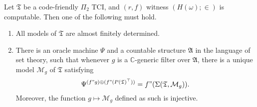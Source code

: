 \documentclass[12pt]{article}
\numberwithin{equation}{section}
\begin{document}
\begin{lem}\label{ctblegeneric}
Let $\mathfrak{T}$ be a code-friendly $\Pi_2$ TCI, and $(r, f)$ witness $(H(\omega); \in)$ is computable. Then one of the following must hold.
\begin{enumerate}[label=(\arabic*)]
    \item All models of $\mathfrak{T}$ are almost finitely determined.
    \item\label{3782} There is an oracle machine $\Psi$ and a countable structure $\mathfrak{A}$ in the language of set theory, such that whenever $g$ is a $\mathbb{C}$-generic filter over $\mathfrak{A}$, there is a unique model $\mathcal{M}_g$ of $\mathfrak{T}$ satisfying 
    \begin{equation*}
        \Psi^{(f" g) \oplus (f" (P(\mathfrak{T})^{\top}))} = f" (\Sigma(\mathfrak{T}, \mathcal{M}_g)) \text{.}
    \end{equation*}
    Moreover, the function $g \mapsto \mathcal{M}_g$ defined as such is injective.
\end{enumerate}
\end{lem}
\end{document}
